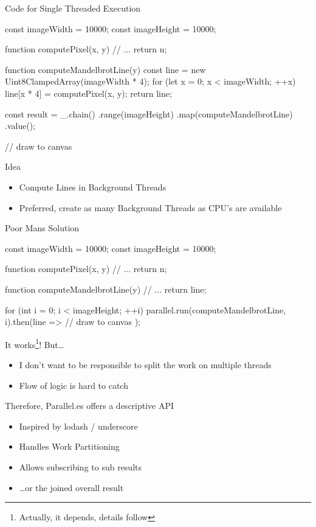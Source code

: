 \begin{frame}{Code for Single Threaded Execution}
		\begin{javascriptcode}
const imageWidth = 10000;
const imageHeight = 10000;

function computePixel(x, y) {
	// ...
	return n;
}

function computeMandelbrotLine(y) {
	const line = new Uint8ClampedArray(imageWidth * 4);
	for (let x = 0; x < imageWidth; ++x) {
		line[x * 4] = computePixel(x, y);
	}
	return line;
}

const result = _.chain()
	.range(imageHeight)
	.map(computeMandelbrotLine)
	.value();
	
// draw to canvas
\end{javascriptcode}
\end{frame}

\begin{frame}{Idea}
	\begin{itemize}
		\item Compute Lines in Background Threads
		\item Preferred, create as many Background Threads as CPU's are available
	\end{itemize}
\end{frame}

\begin{frame}[fragile]{Poor Mans Solution}
	\begin{javascriptcode}
const imageWidth = 10000;
const imageHeight = 10000;

function computePixel(x, y) {
	// ...
	return n;
}

function computeMandelbrotLine(y) {
	// ...
	return line;
}

for (int i = 0; i < imageHeight; ++i) {
	parallel.run(computeMandelbrotLine, i).then(line => {
		// draw to canvas
	});
}
	\end{javascriptcode}
\end{frame}

\begin{frame}{It works\footnote{Actually, it depends, details follow}! But\dots}
	\begin{itemize}
		\item I don't want to be responsible to split the work on multiple threads
		\item Flow of logic is hard to catch
	\end{itemize}
\end{frame}

\begin{frame}{Therefore, Parallel.es offers a descriptive API}
	\begin{itemize}
		\item Inspired by lodash / underscore
		\item Handles Work Partitioning
		\item Allows subscribing to sub results
		\item \dots or the joined overall result
	\end{itemize}
\end{frame}


